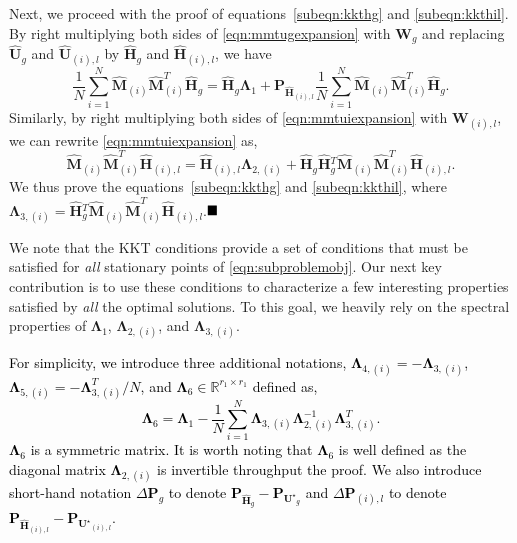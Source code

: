 \documentclass[twoside,11pt]{article}
\newcommand{\revise}[1]{\textcolor{black}{ #1}}
\newcommand{\matE}{\mathbf{E}}
\newcommand{\hmatH}{{\hat{\mathbf{H}}}{}}
\newcommand{\matHst}{{\mathbf{H}^\star}}
\newcommand{\matLst}{{\mathbf{L}^\star}}
\newcommand{\matP}{\mathbf{P}}
\newcommand{\matLambda}{\mathbf{\Lambda}}
\newcommand{\matUst}{{\mathbf{U}^\star}}
\newcommand{\matW}{\mathbf{W}}
\newcommand{\hmatM}{\hat{\mathbf{M}}}
\newcommand{\hmatU}{\hat{\mathbf{U}}}
\begin{document}
Next, we proceed with the proof of equations~\eqref{subeqn:kkthg} and \eqref{subeqn:kkthil}. By right multiplying both sides of \eqref{eqn:mmtugexpansion} with $\matW_g$ and replacing $\hmatU_g$ and $\hmatU_{(i),l}$ by $\hmatH_g$ and $\hmatH_{(i),l}$, we have
\begin{equation}
\frac{1}{N}\sum_{i=1}^N\hmatM_{(i)}\hmatM_{(i)}^T\hmatH_{g} = \hmatH_{g}\matLambda_{1}+\matP_{\hmatH_{(i),l}}\frac{1}{N}\sum_{i=1}^N\hmatM_{(i)}\hmatM_{(i)}^T\hmatH_{g}.  
\end{equation}
Similarly, by right multiplying both sides of \eqref{eqn:mmtuiexpansion} with $\matW_{(i),l}$, we can rewrite \eqref{eqn:mmtuiexpansion} as,
\begin{equation}
\hmatM_{(i)}\hmatM_{(i)}^T\hmatH_{(i),l} = \hmatH_{(i),l}\matLambda_{2,(i)}+\hmatH_{g}\hmatH_{g}^T\hmatM_{(i)}\hmatM_{(i)}^T\hmatH_{(i),l} . 
\end{equation}
We thus prove the equations~\eqref{subeqn:kkthg} and \eqref{subeqn:kkthil}, where $\matLambda_{3,(i)} = \hmatH_{g}^T\hmatM_{(i)}\hmatM_{(i)}^T\hmatH_{(i),l} $.$\hfill\blacksquare$

We note that the KKT conditions provide a set of conditions that must be satisfied for \textit{all} stationary points of \eqref{eqn:subproblemobj}. Our next key contribution is to use these conditions to characterize a few interesting properties satisfied by \textit{all} the optimal solutions. To this goal, we heavily rely on the spectral properties of $\matLambda_1$, $\matLambda_{2,(i)}$, and $\matLambda_{3,(i)}$. %

\revise{For simplicity, we introduce three additional notations, $\matLambda_{4,(i)} = -\matLambda_{3,(i)}$,  $\matLambda_{5,(i)}=-\matLambda_{3,(i)}^T/N$, and $\matLambda_6\in \mathbb{R}^{r_1\times r_1}$ defined as,
\begin{equation}
\label{eqn:deflambda6}
\matLambda_6 = \matLambda_1 - \frac{1}{N}\sum_{i=1}^N\matLambda_{3,(i)}\matLambda_{2,(i)}^{-1}\matLambda_{3,(i)}^T.
\end{equation}
$\matLambda_6$ is a symmetric matrix. It is worth noting that $\matLambda_6$ is well defined as the diagonal matrix $\matLambda_{2,(i)}$ is invertible throughput the proof. We also introduce short-hand notation $\Delta \matP_g$ to denote $\matP_{\hmatH_g}-\matP_{\matUst_g}$ and $\Delta \matP_{(i),l}$ to denote $\matP_{\hmatH_{(i),l}}-\matP_{\matUst_{(i),l}}$.}
\end{document}
